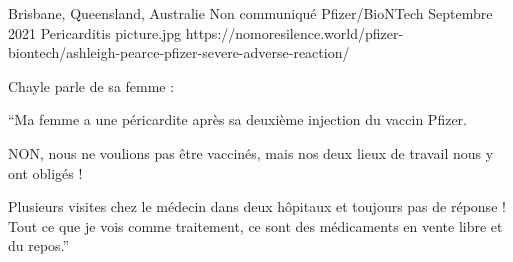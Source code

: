 {Brisbane, Queensland, Australie}
{Non communiqué}
{Pfizer/BioNTech}
{Septembre 2021}
{Pericarditis}
{picture.jpg}
{https://nomoresilence.world/pfizer-biontech/ashleigh-pearce-pfizer-severe-adverse-reaction/}
{

Chayle parle de sa femme :

“Ma femme a une péricardite après sa deuxième injection du vaccin Pfizer.

NON, nous ne voulions pas être vaccinés, mais nos deux lieux de travail nous y
ont obligés !

Plusieurs visites chez le médecin dans deux hôpitaux et toujours pas de réponse
! Tout ce que je vois comme traitement, ce sont des médicaments en vente libre
et du repos.”

}
